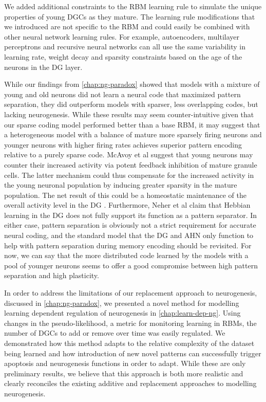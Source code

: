 We added additional constraints to the \ac{RBM} learning rule to 
simulate the unique properties of young \acp{DGC} as they mature.
The learning rule modifications that we introduced are not specific to the \ac{RBM} and could easily be
combined with other neural network learning rules. 
For example, autoencoders,  
multilayer perceptrons and recursive neural networks can all use the same variability 
in learning rate, weight decay and sparsity constraints based on the age of the neurons 
in the \ac{DG} layer. 

While our findings from \cref{chap:ng-paradox} showed that models with a mixture 
of young and old neurons did not learn a neural code 
that maximized pattern separation, they did outperform models with sparser, 
less overlapping codes, but lacking neurogenesis. 
While these results may seem counter-intuitive given that our sparse coding model 
performed better than a base \ac{RBM}, it may suggest that a heterogeneous 
model with a balance of mature more sparsely firing neurons and younger 
neurons with higher firing rates achieves superior pattern encoding 
relative to a purely sparse code. 
McAvoy et al \citeyearpar{mcavoy-et-al-15} suggest that young neurons 
may counter their increased activity via potent feedback inhibition of mature granule cells. 
The latter mechanism could thus compensate for the increased activity in the young 
neuronal population by inducing greater sparsity in the mature population.
The net result of this could be a homeostatic maintenance of the overall 
activity level in the \ac{DG} \citep{mcavoy-et-al-15}.
Furthermore, Neher et al \citeyearpar{neher-15} claim that Hebbian learning 
in the \ac{DG} does not fully support its function as a pattern separator.
In either case, pattern separation is obviously 
not a strict requirement for accurate neural coding, and the standard 
model that the \ac{DG} and \ac{AHN} only function to help with pattern separation
during memory encoding should be revisited. 
For now, we can say that the more distributed code learned by 
the models with a pool of younger neurons seems to offer a good compromise between 
high pattern separation and high plasticity.

In order to address the limitations of our replacement approach to neurogenesis, 
discussed in \cref{chap:ng-paradox}, we presented a novel method for modelling 
learning dependent regulation of neurogenesis in \cref{chap:learn-dep-ng}. 
Using changes in the pseudo-likelihood, 
a metric for monitoring learning in \acp{RBM}, the number of \acp{DGC} to add 
or remove over time was easily regulated. 
We demonstrated how this method 
adapts to the relative complexity of the dataset being learned and how introduction 
of new novel patterns can successfully trigger apoptosis and neurogenesis functions 
in order to adapt. 
While these are only preliminary results, we believe that this approach 
is both more realistic and clearly reconciles the existing additive and replacement approaches 
to modelling neurogenesis.

